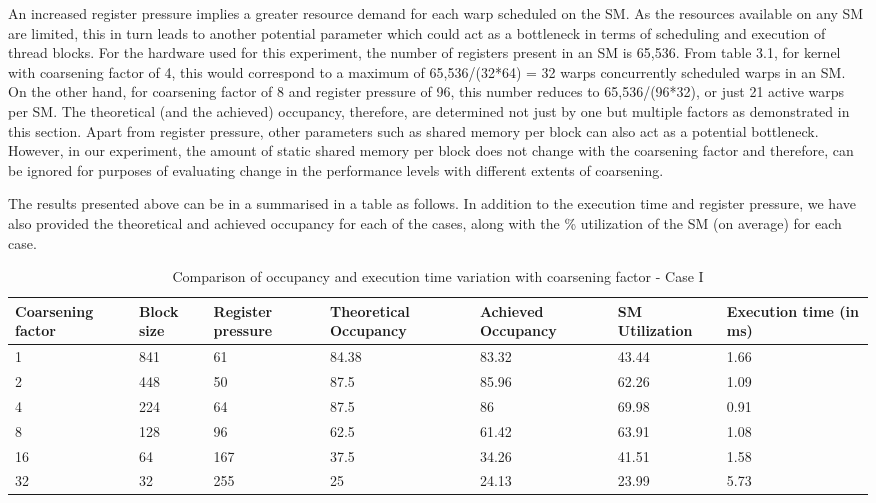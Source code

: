 An increased register pressure implies a greater resource demand for each warp scheduled on the SM. As the resources available on any SM are limited, this in turn leads to another potential parameter which could act as a bottleneck in terms of scheduling and execution of thread blocks. For the hardware used for this experiment, the number of registers present in an SM is 65,536. From table 3.1, for kernel with coarsening factor of 4, this would correspond to a maximum of 65,536/(32*64) = 32 warps concurrently scheduled warps in an SM. On the other hand, for coarsening factor of 8 and register pressure of 96, this number reduces to 65,536/(96*32), or just 21 active warps per SM. The theoretical (and the achieved) occupancy, therefore, are determined not just by one but multiple factors as demonstrated in this section. Apart from register pressure, other parameters such as shared memory per block can also act as a potential bottleneck. However, in our experiment, the amount of static shared memory per block does not change with the coarsening factor and therefore, can be ignored for purposes of evaluating change in the performance levels with different extents of coarsening. 

The results presented above can be in a summarised in a table as follows. In addition to the execution time and register pressure, we have also provided the theoretical and achieved occupancy for each of the cases, along with the \% utilization of the SM (on average) for each case.


\begin{table}[ht]
    \centering
    
    \begin{tabular}{ |p{2cm}|p{1.5cm}|p{1.5cm}|p{2cm}|p{2cm}|p{2cm}|p{2cm}|  }
         \hline
         Coarsening factor & Block size & Register pressure & Theoretical Occupancy & Achieved Occupancy & SM Utilization & Execution time (in ms) \\
         \hline
         
         1    & 841 & 61 & 84.38 & 83.32 & 43.44 & 1.66\\
         2                  & 448 & 50 & 87.5 & 85.96 &62.26 &  1.09\\
         4                  & 224 & 64 & 87.5 & 86 & 69.98 & 0.91\\
         8                  & 128 & 96 & 62.5 & 61.42 & 63.91 & 1.08\\
         16                 & 64 & 167 & 37.5 & 34.26 & 41.51 & 1.58\\
         32                 & 32 & 255 & 25 & 24.13 & 23.99 & 5.73\\
         \hline
    \end{tabular}
    \caption{\small Comparison of occupancy and execution time variation with coarsening factor - Case I}
    \label{tab:block_size_good_coarsen}
\end{table}



